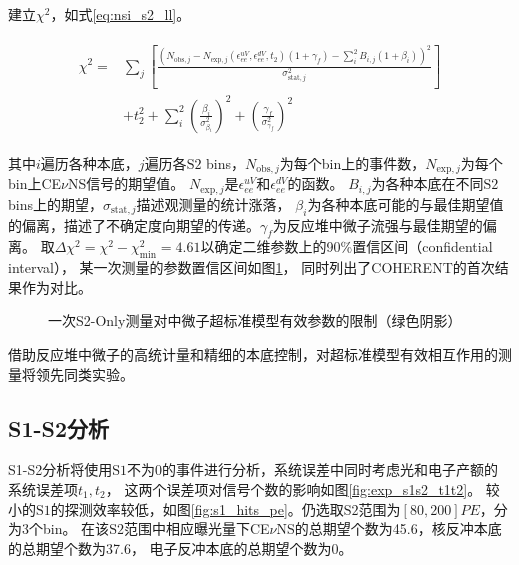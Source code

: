 建立$\chi^2$，如式\ref{eq:nsi_s2_ll}。

\begin{align}
    \label{eq:nsi_s2_ll}
    \begin{split}
    \chi^2 =& \sum_j\left[\frac{\left(N_{\mathrm{obs},j} - N_{\mathrm{exp},j}(\epsilon^{uV}_{ee}, \epsilon^{dV}_{ee}, t_2)(1 + \gamma_f) 
    - \sum_{i}^2 B_{i,j}(1 + \beta_i)\right)^2}{\sigma^2_{\mathrm{stat},j}}\right] \\
    & + t_2^2 + \sum_{i}^2(\frac{\beta_i}{\sigma^2_{\beta_i}})^2 + (\frac{\gamma_f}{\sigma^2_{\gamma_f}})^2
    \end{split}
\end{align}

其中$i$遍历各种本底，$j$遍历各$\mathrm{S2}$ bins，$N_{\mathrm{obs},j}$为每个bin上的事件数，$N_{\mathrm{exp},j}$为每个bin上CE$\nu$NS信号的期望值。
$N_{\mathrm{exp},j}$是$\epsilon^{uV}_{ee}$和$\epsilon^{dV}_{ee}$的函数。
$B_{i,j}$为各种本底在不同$\mathrm{S2}$ bins上的期望，$\sigma_{\mathrm{stat},j}$描述观测量的统计涨落，
$\beta_i$为各种本底可能的与最佳期望值的偏离，描述了不确定度向期望的传递。$\gamma_f$为反应堆中微子流强与最佳期望的偏离。
取$\Delta \chi^2=\chi^2-\chi^2_\mathrm{min}=4.61$以确定二维参数上的90\%置信区间（confidential interval），
某一次测量的参数置信区间如图\ref{fig:nsi_sensitivity_s2only}，
同时列出了COHERENT的首次结果作为对比\cite{akimov_observation_2017}。

\begin{figure}
  \centering
  
  \caption{\label{fig:nsi_sensitivity_s2only} 一次S2-Only测量对中微子超标准模型有效参数的限制（绿色阴影）}
\end{figure}

借助反应堆中微子的高统计量和精细的本底控制，对超标准模型有效相互作用的测量将领先同类实验。

\subsection{S1-S2分析}

S1-S2分析将使用$\mathrm{S1}$不为0的事件进行分析，系统误差中同时考虑光和电子产额的系统误差项$t_1,t_2$，
这两个误差项对信号个数的影响如图\ref{fig:exp_s1s2_t1t2}。
较小的$\mathrm{S1}$的探测效率较低，如图\ref{fig:s1_hits_pe}。仍选取$\mathrm{S2}$范围为$[80, 200]\si{PE}$，分为3个bin。
在该$\mathrm{S2}$范围中相应曝光量下CE$\nu$NS的总期望个数为45.6，核反冲本底的总期望个数为37.6，
电子反冲本底的总期望个数为0。

